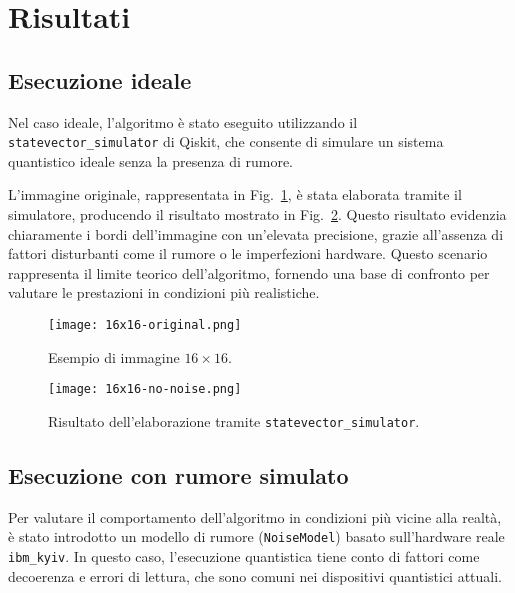 \section{Risultati}\label{sec:risultati}

\subsection{Esecuzione ideale}

Nel caso ideale, l'algoritmo è stato eseguito
utilizzando il \texttt{statevector\_simulator} di Qiskit, che consente di
simulare un sistema quantistico ideale senza la presenza di rumore.

L'immagine originale, rappresentata in Fig.~\ref{fig:16x16-original}, è stata
elaborata tramite il simulatore, producendo il risultato mostrato in
Fig.~\ref{fig:16x16-no-noise}. Questo risultato evidenzia chiaramente i bordi
dell'immagine con un'elevata precisione, grazie all'assenza di fattori
disturbanti come il rumore o le imperfezioni hardware. Questo scenario
rappresenta il limite teorico dell'algoritmo, fornendo una base di confronto per
valutare le prestazioni in condizioni più realistiche.

\begin{figure}[ht]
	\begin{center}
		\texttt{[image: 16x16-original.png]}
	\end{center}
	\caption{Esempio di immagine $16\times16$.}\label{fig:16x16-original}
\end{figure}

\begin{figure}[ht]
	\begin{center}
		\texttt{[image: 16x16-no-noise.png]}
	\end{center}
	\caption{Risultato dell'elaborazione tramite \texttt{statevector\_simulator}.}\label{fig:16x16-no-noise}
\end{figure}

\subsection{Esecuzione con rumore simulato}

Per valutare il comportamento dell'algoritmo in condizioni più vicine alla
realtà, è stato introdotto un modello di rumore (\texttt{NoiseModel}) basato
sull'hardware reale \texttt{ibm\_kyiv}. In questo caso, l'esecuzione quantistica
tiene conto di fattori come decoerenza e errori di lettura, che sono comuni nei
dispositivi quantistici attuali.

